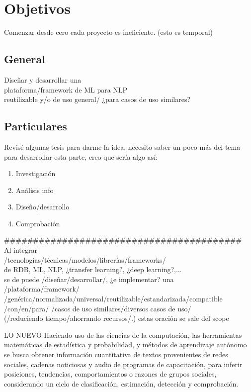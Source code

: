 \section {Objetivos}\label{sec:objetivos}
Comenzar desde cero cada proyecto es ineficiente. (esto es temporal)
\subsection {General}
Diseñar y desarrollar una\\
plataforma/framework de ML para NLP\\
reutilizable y/o de uso general/ ¿para casos de uso similares?
\subsection {Particulares}
Revisé algunas tesis para darme la idea, necesito saber un poco más del tema para desarrollar esta parte, creo que sería algo así:
\begin{enumerate}
    \item Investigación
    \item Análisis info
    \item Diseño/desarrollo
    \item Comprobación
\end{enumerate}

\#\#\#\#\#\#\#\#\#\#\#\#\#\#\#\#\#\#\#\#\#\#\#\#\#\#\#\#\#\#\#\#\#\#\#\#\#\#\#\#\#\\

Al integrar\\
/tecnologías/técnicas/modelos/librerías/frameworks/\\
de RDB, ML, NLP, ¿transfer learning?, ¿deep learning?,...\\
se de puede /diseñar/desarrollar/, ¿e implementar? una\\
/plataforma/framework/\\
/genérica/normalizada/universal/reutilizable/estandarizada/compatible\\
/con/en/para/ /casos de uso similares/diversos casos de uso/\\
(/reduciendo tiempo/ahorrando recursos/.) estas oración se sale del scope

LO NUEVO
Haciendo uso de las ciencias de la computación, las herramientas matemáticas de estadística y probabilidad, y métodos de aprendizaje autónomo se busca obtener información cuantitativa de textos provenientes de redes sociales, cadenas noticiosas y audio de programas de capacitación, para inferir posiciones, tendencias, comportamientos o razones de grupos sociales, considerando un ciclo de clasificación, estimación, detección y comprobación.

